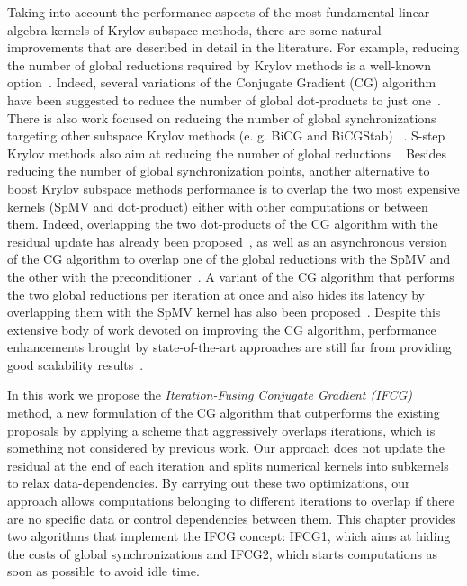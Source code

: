 Taking into account the performance aspects of the most fundamental linear algebra kernels of Krylov subspace methods, there are some natural improvements that are described in detail in the literature.
For example, reducing the number of global reductions required by Krylov methods is a well-known option~\cite{rosendale83, Barret94}. 
Indeed, several variations of the Conjugate Gradient (CG) algorithm have been suggested to reduce the number of global dot-products to just one~\cite{chronopoulos89, Saad84, Meurant87, Azevedo93}.
There is also work focused on reducing the number of global synchronizations targeting other subspace Krylov methods (e. g. BiCG and BiCGStab) ~\cite{Yang02, Yang02-1, ghysels13, chronopoulos91}. 
S-step Krylov methods also aim at reducing the number of global reductions~\cite{vorst95, newton95, wayne91, hoemmen}.  
Besides reducing the number of global synchronization points, another alternative to boost Krylov subspace methods performance is to overlap the two most expensive kernels (SpMV and dot-product) either with other computations or between them.
Indeed, overlapping the two dot-products of the CG algorithm with the residual update has already 
been proposed~\cite{Demmel93}, as well as an asynchronous version of the CG algorithm to overlap one of the global reductions with the SpMV and the other with the preconditioner~\cite{gropp10}. 
A variant of the CG algorithm that performs the two global reductions per iteration at once and also hides its latency by overlapping them with the SpMV kernel has also been proposed~\cite{ghysels14}.
Despite this extensive body of work devoted on improving the CG algorithm, performance enhancements brought by state-of-the-art approaches are still far from providing good scalability results~\cite{ghysels14}. 

In this work we propose the \emph{Iteration-Fusing Conjugate Gradient (IFCG)} method, a new formulation of the CG algorithm that outperforms the existing proposals by applying a scheme that aggressively overlaps iterations, which is something not considered by previous work. 
Our approach 
does not update the residual at the end of each iteration and splits numerical kernels into subkernels to relax data-dependencies.
By carrying out these two optimizations, our approach allows computations belonging to different iterations to overlap if there are no specific data or control dependencies between them.
This chapter provides two algorithms that implement the IFCG concept: 
IFCG1, which aims at hiding the costs of global synchronizations and IFCG2, which starts computations as soon as possible to avoid idle time. 

